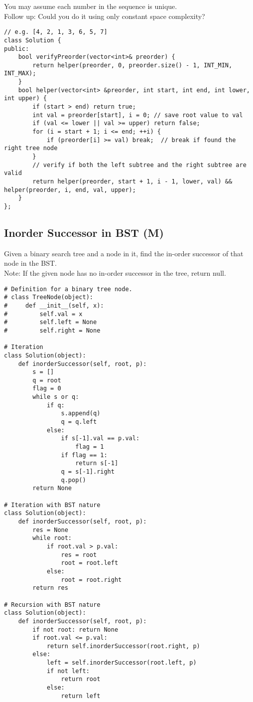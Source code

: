 You may assume each number in the sequence is unique.\\

Follow up:
Could you do it using only constant space complexity?\\

\begin{lstlisting}
// e.g. [4, 2, 1, 3, 6, 5, 7]
class Solution {
public:
    bool verifyPreorder(vector<int>& preorder) {
        return helper(preorder, 0, preorder.size() - 1, INT_MIN, INT_MAX);
    }
    bool helper(vector<int> &preorder, int start, int end, int lower, int upper) {
        if (start > end) return true;
        int val = preorder[start], i = 0; // save root value to val
        if (val <= lower || val >= upper) return false;
        for (i = start + 1; i <= end; ++i) {
            if (preorder[i] >= val) break;  // break if found the right tree node
        }
        // verify if both the left subtree and the right subtree are valid
        return helper(preorder, start + 1, i - 1, lower, val) && helper(preorder, i, end, val, upper);
    }
};
\end{lstlisting}


\subsection{Inorder Successor in BST (M)}
Given a binary search tree and a node in it, find the in-order successor of that node in the BST.\\

Note: If the given node has no in-order successor in the tree, return null.\\

\begin{lstlisting}
# Definition for a binary tree node.
# class TreeNode(object):
#     def __init__(self, x):
#         self.val = x
#         self.left = None
#         self.right = None

# Iteration
class Solution(object):
    def inorderSuccessor(self, root, p):
        s = []
        q = root
        flag = 0
        while s or q:
            if q:
                s.append(q)
                q = q.left
            else:
                if s[-1].val == p.val:
                    flag = 1
                if flag == 1:
                    return s[-1]
                q = s[-1].right
                q.pop()
        return None
        
# Iteration with BST nature
class Solution(object):
    def inorderSuccessor(self, root, p):
        res = None
        while root:
            if root.val > p.val:
                res = root
                root = root.left
            else:
                root = root.right
        return res
        
# Recursion with BST nature
class Solution(object):
    def inorderSuccessor(self, root, p):
        if not root: return None
        if root.val <= p.val:
            return self.inorderSuccessor(root.right, p)
        else:
            left = self.inorderSuccessor(root.left, p)
            if not left:
                return root
            else: 
                return left
\end{lstlisting}

